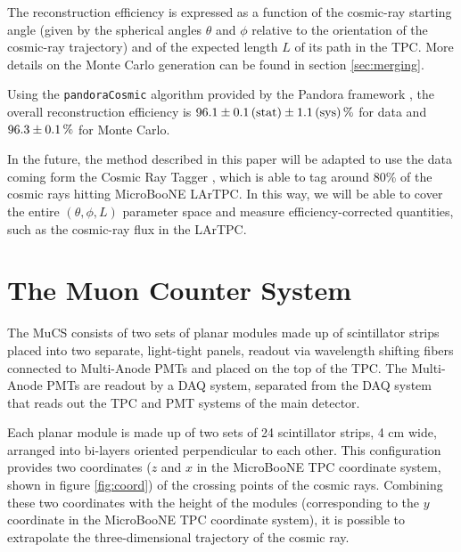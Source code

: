 \documentclass[a4paper]{scrartcl}
\begin{document}
The reconstruction efficiency is expressed as a function of the cosmic-ray starting angle (given by the spherical angles $\theta$ and $\phi$ relative to the orientation of the cosmic-ray trajectory) and of the expected length $L$ of its path in the TPC. More details on the Monte Carlo generation can be found in section \ref{sec:merging}.%

Using the \texttt{pan\-do\-ra\-Co\-smic} algorithm \cite{pandoracosmic} provided by the Pandora framework \cite{pandora}, the overall reconstruction efficiency is $96.1\pm0.1\thinspace(\mathrm{stat}) \pm 1.1\thinspace(\mathrm{sys})\thinspace\%$ for data and $96.3\pm0.1\thinspace\%$ for Monte Carlo.

In the future, the method described in this paper will be adapted to use the data coming form the Cosmic Ray Tagger \cite{crt}, which is able to tag around 80\% of the cosmic rays hitting MicroBooNE LArTPC. In this way, we will be able to cover the entire $(\theta,\phi,L)$ parameter space and measure efficiency-corrected quantities, such as the cosmic-ray flux in the LArTPC.

\section{The Muon Counter System}\label{sec:proc}
The MuCS consists of two sets of planar modules made up of scintillator strips placed into two separate, light-tight panels, readout via wavelength shifting fibers connected to Multi-Anode PMTs and placed on the top of the TPC. The Multi-Anode PMTs are readout by a DAQ system, separated from the DAQ system that reads out the TPC and PMT systems of the main detector.

Each planar module is made up of two sets of 24 scintillator strips, 4 cm wide, arranged into bi-layers oriented perpendicular to each other. This configuration provides two coordinates ($z$ and $x$ in the MicroBooNE TPC coordinate system, shown in figure \ref{fig:coord}) of the crossing points of the cosmic rays. Combining these two coordinates with the height of the modules (corresponding to the $y$ coordinate in the MicroBooNE TPC coordinate system), it is possible to extrapolate the three-dimensional trajectory of the cosmic ray.
\end{document}
